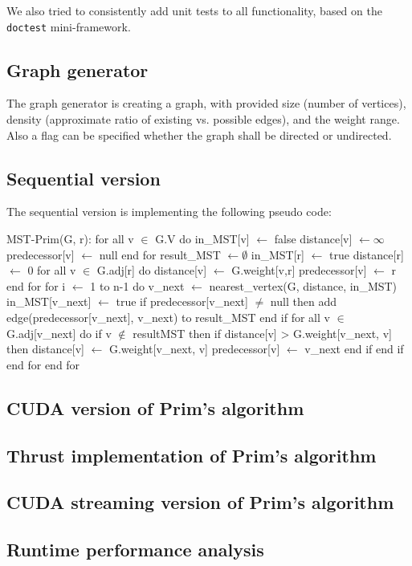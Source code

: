 \documentclass[sigconf,nonacm]{acmart}
\begin{document}
We also tried to consistently add unit tests to all functionality,
based on the \texttt{doctest} mini-framework.

\subsection{Graph generator}

The graph generator is creating a graph, with provided size (number of vertices),
density (approximate ratio of existing vs. possible edges), and the weight range.
Also a flag can be specified whether the graph shall be directed or undirected.

\subsection{Sequential version}

The sequential version is implementing the following pseudo code:
\begin{algorithm}[caption={Sequential Prim}, label={prim:cpu}]
MST-Prim(G, r):
for all v $\in$ G.V do
  in_MST[v] $\gets$ false
  distance[v] $\gets \infty$
  predecessor[v] $\gets$ null
end for
result_MST $\gets \emptyset$
in_MST[r] $\gets$ true
distance[r] $\gets$ 0
for all v $\in$ G.adj[r] do
  distance[v] $\gets$ G.weight[v,r]
  predecessor[v] $\gets$ r
end for
for i $\gets$ 1 to n-1 do
  v_next $\gets$ nearest_vertex(G, distance, in_MST)
  in_MST[v_next] $\gets$ true
  if predecessor[v_next] $\ne$ null then
    add edge(predecessor[v_next], v_next) to result_MST
  end if
  for all v $\in$ G.adj[v_next] do
    if v $\notin$ resultMST then
      if distance[v] > G.weight[v_next, v] then
        distance[v] $\gets$ G.weight[v_next, v]
        predecessor[v] $\gets$ v_next
      end if
    end if
  end for
end for
\end{algorithm}

\subsection{CUDA version of Prim's algorithm}
\subsection{Thrust implementation of Prim's algorithm}
\subsection{CUDA streaming version of Prim's algorithm}
\subsection{Runtime performance analysis}



\end{document}
